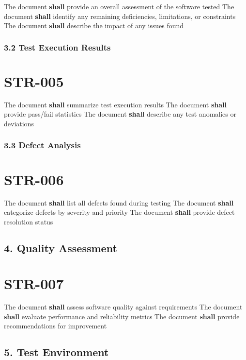 The document \textbf{shall} provide an overall assessment of the software tested
The document \textbf{shall} identify any remaining deficiencies, limitations, or constraints
The document \textbf{shall} describe the impact of any issues found

\subsubsection{3.2 Test Execution Results}

\section{STR-005}\label{STR-005}

The document \textbf{shall} summarize test execution results
The document \textbf{shall} provide pass/fail statistics
The document \textbf{shall} describe any test anomalies or deviations

\subsubsection{3.3 Defect Analysis}

\section{STR-006}\label{STR-006}

The document \textbf{shall} list all defects found during testing
The document \textbf{shall} categorize defects by severity and priority
The document \textbf{shall} provide defect resolution status

\subsection{4. Quality Assessment}

\section{STR-007}\label{STR-007}

The document \textbf{shall} assess software quality against requirements
The document \textbf{shall} evaluate performance and reliability metrics
The document \textbf{shall} provide recommendations for improvement

\subsection{5. Test Environment}


